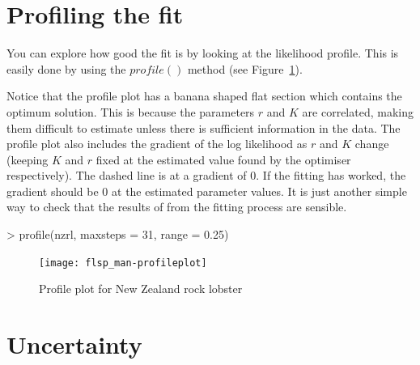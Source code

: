 \documentclass[a4paper]{article}
\begin{document}
\section{Profiling the fit}

You can explore how good the fit is by looking at the likelihood profile. This is easily done by using the $profile()$ method (see Figure~\ref{fig:profile_nzrl}).

Notice that the profile plot has a banana shaped flat section which contains the optimum solution. This is because the parameters $r$ and $K$ are correlated, making them difficult to estimate unless there is sufficient information in the data.
The profile plot also includes the gradient of the log likelihood as $r$ and $K$ change (keeping $K$ and $r$ fixed at the estimated value found by the optimiser respectively). The dashed line is at a gradient of 0. If the fitting has worked, the gradient should be 0 at the estimated parameter values. It is just another simple way to check that the results of from the fitting process are sensible.

\begin{center}
\begin{minipage}[H]{0.95\textwidth}%
\begin{shaded}%
\begin{Schunk}
\begin{Sinput}
> profile(nzrl, maxsteps = 31, range = 0.25)
\end{Sinput}
\end{Schunk}
\end{shaded}%
\end{minipage}
\end{center}

\begin{figure}
\begin{center}
\texttt{[image: flsp\_man-profileplot]}
\end{center}
\caption{Profile plot for New Zealand rock lobster}
\label{fig:profile_nzrl}
\end{figure}

\section{Uncertainty}

\end{document}

